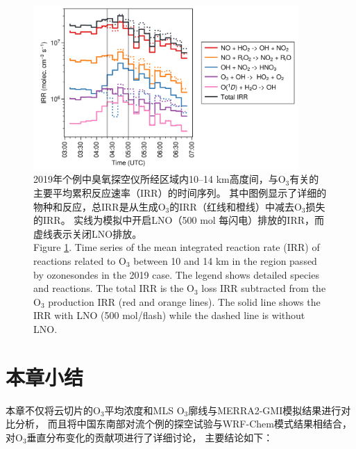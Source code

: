 \begin{figure}[H]
\centering
\includegraphics[width=0.9\textwidth]{./figures/irr_timeseries.png}
\caption{
2019年个例中臭氧探空仪所经区域内10--14 km高度间，与O$_3$有关的主要平均累积反应速率（IRR）的时间序列。
其中图例显示了详细的物种和反应，总IRR是从生成O$_3$的IRR（红线和橙线）中减去O$_3$损失的IRR。
实线为模拟中开启LNO（500 mol 每闪电）排放的IRR，而虚线表示关闭LNO排放。\\
Figure \ref{fig:irr_timeseries}. Time series of the mean integrated reaction rate (IRR) of reactions related to O$_3$ between 10 and 14 km in the region passed by ozonesondes in the 2019 case.
The legend shows detailed species and reactions.
The total IRR is the O$_3$ loss IRR subtracted from the O$_3$ production IRR (red and orange lines).
The solid line shows the IRR with LNO (500 mol/flash) while the dashed line is without LNO.
}
\label{fig:irr_timeseries}
\end{figure}


\section{本章小结}

本章不仅将云切片的O$_3$平均浓度和MLS O$_3$廓线与MERRA2-GMI模拟结果进行对比分析，
而且将中国东南部对流个例的探空试验与WRF-Chem模式结果相结合，对O$_3$垂直分布变化的贡献项进行了详细讨论，
主要结论如下：

